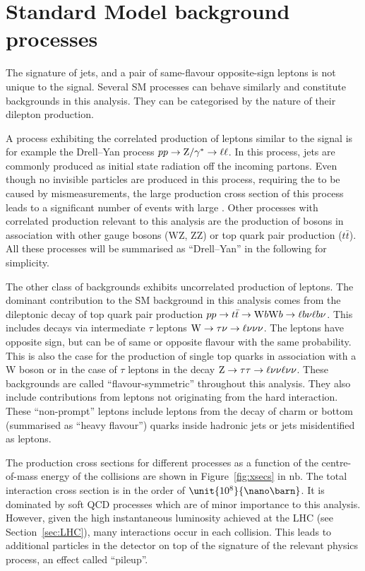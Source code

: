 \section{Standard Model background processes}
\label{sec:SMBackgrounds}
The signature of jets, \MET and a pair of same-flavour opposite-sign leptons is not unique to the signal. Several SM processes can behave similarly and constitute backgrounds in this analysis. They can be categorised by the nature of their dilepton production. 

A process exhibiting the correlated production of leptons similar to the signal is for example the Drell--Yan process $pp \rightarrow \mathrm{Z}/\gamma^{*}\rightarrow \ell\ell$. In this process, jets are commonly produced as initial state radiation off the incoming partons. Even though no invisible particles are produced in this process, requiring the \MET to be caused by mismeasurements, the large production cross section of this process leads to a significant number of events with large \MET. Other processes with correlated production relevant to this analysis are the production of \Z bosons in association with other gauge bosons ($\mathrm{WZ}$, $\mathrm{ZZ}$) or top quark pair production ($t\bar{t}$\Z). All these processes will be summarised as ``Drell--Yan'' in the following for simplicity. 

The other class of backgrounds exhibits uncorrelated production of leptons. The dominant contribution to the SM background in this analysis comes from the dileptonic decay of top quark pair production $pp\rightarrow t\bar{t} \rightarrow \mathrm{W} b \mathrm{W} b\rightarrow \ell b\nu \ell b \nu$. This includes decays via intermediate $\tau$ leptons $\mathrm{W}\rightarrow \tau \nu \rightarrow \ell \nu \nu \nu$. The leptons have opposite sign, but can be of same or opposite flavour with the same probability. This is also the case for the production of single top quarks in association with a W boson or in the case of $\tau$ leptons in the decay $\mathrm{Z} \rightarrow \tau\tau \rightarrow \ell\nu\nu\ell\nu\nu$. These backgrounds are called ``flavour-symmetric'' throughout this analysis. They also include contributions from leptons not originating from the hard interaction. These ``non-prompt'' leptons include leptons from the decay of charm or bottom (summarised as ``heavy flavour'') quarks inside hadronic jets or jets misidentified as leptons.

The production cross sections for different processes as a function of the centre-of-mass energy of the collisions are shown in Figure~\ref{fig:xsecs} in $\mathrm{nb}$. The total interaction cross section is in the order of $\unit{10^{8}}{\nano\barn}$. It is dominated by soft QCD processes which are of minor importance to this analysis. However, given the high instantaneous luminosity achieved at the LHC (see Section~\ref{sec:LHC}), many interactions occur in each collision. This leads to additional particles in the detector on top of the signature of the relevant physics process, an effect called ``pileup''.

